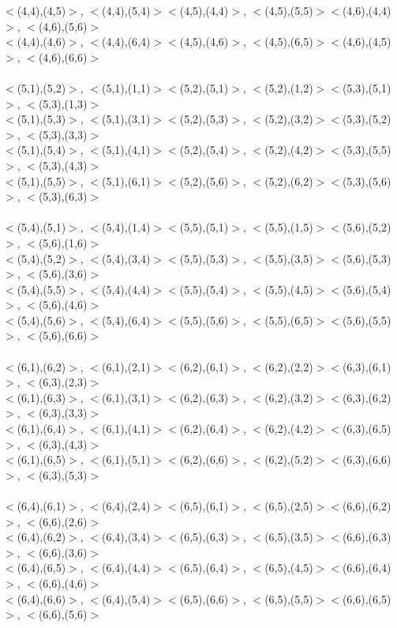 \documentclass{article}
\begin{document}
\begin{enumerate}
$<$(4,4),(4,5)$>$, $<$(4,4),(5,4)$>$\qquad	$<$(4,5),(4,4)$>$, $<$(4,5),(5,5)$>$\qquad	$<$(4,6),(4,4)$>$, $<$(4,6),(5,6)$>$\\
$<$(4,4),(4,6)$>$, $<$(4,4),(6,4)$>$\qquad	$<$(4,5),(4,6)$>$, $<$(4,5),(6,5)$>$\qquad	$<$(4,6),(4,5)$>$, $<$(4,6),(6,6)$>$\\
\\
$<$(5,1),(5,2)$>$, $<$(5,1),(1,1)$>$\qquad	$<$(5,2),(5,1)$>$, $<$(5,2),(1,2)$>$\qquad	$<$(5,3),(5,1)$>$, $<$(5,3),(1,3)$>$\\
$<$(5,1),(5,3)$>$, $<$(5,1),(3,1)$>$\qquad	$<$(5,2),(5,3)$>$, $<$(5,2),(3,2)$>$\qquad	$<$(5,3),(5,2)$>$, $<$(5,3),(3,3)$>$\\
$<$(5,1),(5,4)$>$, $<$(5,1),(4,1)$>$\qquad	$<$(5,2),(5,4)$>$, $<$(5,2),(4,2)$>$\qquad	$<$(5,3),(5,5)$>$, $<$(5,3),(4,3)$>$\\
$<$(5,1),(5,5)$>$, $<$(5,1),(6,1)$>$\qquad	$<$(5,2),(5,6)$>$, $<$(5,2),(6,2)$>$\qquad	$<$(5,3),(5,6)$>$, $<$(5,3),(6,3)$>$\\
\\
$<$(5,4),(5,1)$>$, $<$(5,4),(1,4)$>$\qquad	$<$(5,5),(5,1)$>$, $<$(5,5),(1,5)$>$\qquad	$<$(5,6),(5,2)$>$, $<$(5,6),(1,6)$>$\\
$<$(5,4),(5,2)$>$, $<$(5,4),(3,4)$>$\qquad	$<$(5,5),(5,3)$>$, $<$(5,5),(3,5)$>$\qquad	$<$(5,6),(5,3)$>$, $<$(5,6),(3,6)$>$\\
$<$(5,4),(5,5)$>$, $<$(5,4),(4,4)$>$\qquad	$<$(5,5),(5,4)$>$, $<$(5,5),(4,5)$>$\qquad	$<$(5,6),(5,4)$>$, $<$(5,6),(4,6)$>$\\
$<$(5,4),(5,6)$>$, $<$(5,4),(6,4)$>$\qquad	$<$(5,5),(5,6)$>$, $<$(5,5),(6,5)$>$\qquad	$<$(5,6),(5,5)$>$, $<$(5,6),(6,6)$>$\\
\\
$<$(6,1),(6,2)$>$, $<$(6,1),(2,1)$>$\qquad	$<$(6,2),(6,1)$>$, $<$(6,2),(2,2)$>$\qquad	$<$(6,3),(6,1)$>$, $<$(6,3),(2,3)$>$\\
$<$(6,1),(6,3)$>$, $<$(6,1),(3,1)$>$\qquad	$<$(6,2),(6,3)$>$, $<$(6,2),(3,2)$>$\qquad	$<$(6,3),(6,2)$>$, $<$(6,3),(3,3)$>$\\
$<$(6,1),(6,4)$>$, $<$(6,1),(4,1)$>$\qquad	$<$(6,2),(6,4)$>$, $<$(6,2),(4,2)$>$\qquad	$<$(6,3),(6,5)$>$, $<$(6,3),(4,3)$>$\\
$<$(6,1),(6,5)$>$, $<$(6,1),(5,1)$>$\qquad	$<$(6,2),(6,6)$>$, $<$(6,2),(5,2)$>$\qquad	$<$(6,3),(6,6)$>$, $<$(6,3),(5,3)$>$\\
\\
$<$(6,4),(6,1)$>$, $<$(6,4),(2,4)$>$\qquad	$<$(6,5),(6,1)$>$, $<$(6,5),(2,5)$>$\qquad	$<$(6,6),(6,2)$>$, $<$(6,6),(2,6)$>$\\
$<$(6,4),(6,2)$>$, $<$(6,4),(3,4)$>$\qquad	$<$(6,5),(6,3)$>$, $<$(6,5),(3,5)$>$\qquad	$<$(6,6),(6,3)$>$, $<$(6,6),(3,6)$>$\\
$<$(6,4),(6,5)$>$, $<$(6,4),(4,4)$>$\qquad	$<$(6,5),(6,4)$>$, $<$(6,5),(4,5)$>$\qquad	$<$(6,6),(6,4)$>$, $<$(6,6),(4,6)$>$\\
$<$(6,4),(6,6)$>$, $<$(6,4),(5,4)$>$\qquad	$<$(6,5),(6,6)$>$, $<$(6,5),(5,5)$>$\qquad	$<$(6,6),(6,5)$>$, $<$(6,6),(5,6)$>$\\
\end{enumerate}
\end{document}
